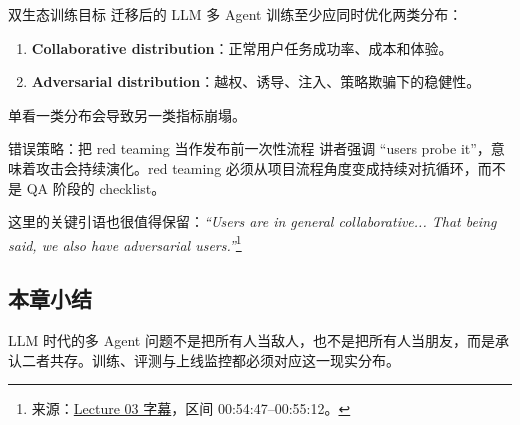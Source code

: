 \begin{importantbox}{双生态训练目标}
迁移后的 LLM 多 Agent 训练至少应同时优化两类分布：
\begin{enumerate}
    \item \textbf{Collaborative distribution}：正常用户任务成功率、成本和体验。
    \item \textbf{Adversarial distribution}：越权、诱导、注入、策略欺骗下的稳健性。
\end{enumerate}
单看一类分布会导致另一类指标崩塌。
\end{importantbox}

\begin{warningbox}{错误策略：把 red teaming 当作发布前一次性流程}
讲者强调 ``users probe it''，意味着攻击会持续演化。red teaming 必须从项目流程角度变成持续对抗循环，而不是 QA 阶段的 checklist。
\end{warningbox}

这里的关键引语也很值得保留：\textit{``Users are in general collaborative... That being said, we also have adversarial users.''}\footnote{来源：\href{https://www.youtube.com/watch?v=ntjOxjZMaac}{Lecture 03 字幕}，区间 00:54:47--00:55:12。}

\subsection{本章小结}
LLM 时代的多 Agent 问题不是把所有人当敌人，也不是把所有人当朋友，而是承认二者共存。训练、评测与上线监控都必须对应这一现实分布。

